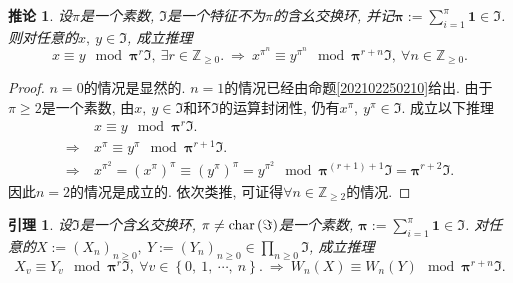 \documentclass[UTF8, twoside]{ctexart}
\theoremstyle{nonumberplain}
\newtheorem{proof}{\heiti 证明}  %
\theoremstyle{nonumberplain}
\theoremstyle{plain}
\newtheorem{yinli4}[dingyi4]{引理}
\newtheorem{tuilun4}[dingyi4]{推论}
\begin{document}
	\begin{tuilun4} \label{202102250947}
		设$\pi $是一个素数, $\Im $是一个特征不为$\pi $的含幺交换环, 并记$\bm{\pi} :=\sum_{i=1}^{\pi }{\bm{1}\in \Im }$. 则对任意的$x,\ y\in \Im $, 成立推理
		\[
			x\equiv y\ \bmod {\bm{\pi }^{r}}\Im ,
			\ \exists r\in {{\mathbb{Z}}_{\ge 0}}.
			\ \Longrightarrow \ 
			{{x}^{{{\pi }^{n}}}}\equiv {{y}^{{{\pi }^{n}}}}\ \bmod {\bm{\pi }^{r+n}}\Im ,
			\ \forall n\in {{\mathbb{Z}}_{\ge 0}}.
		\]
	\end{tuilun4}
	\begin{proof}
		$n=0$的情况是显然的. $n=1$的情况已经由命题\ref{202102250210}给出. 由于$\pi \ge 2$是一个素数, 由$x,\ y\in \Im $和环$\Im $的运算封闭性, 仍有${{x}^{\pi }},
		\ {{y}^{\pi }}\in \Im .$ 成立以下推理
		\begin{align*}
			& x\equiv y\ \bmod {\bm{\pi }^{r}}\Im . \\ 
			\Longrightarrow\ & {{x}^{\pi }}\equiv {{y}^{\pi }}\ \bmod {\bm{\pi }^{r+1}}\Im . \\ 
			\Longrightarrow\ & {{x}^{{{\pi }^{2}}}}={{\left( {{x}^{\pi }} \right)}^{\pi }}\equiv {{\left( {{y}^{\pi }} \right)}^{\pi }}={{y}^{{{\pi }^{2}}}}\ \bmod {\bm{\pi }^{\left( r+1 \right)+1}}\Im ={\bm{\pi }^{r+2}}\Im .
		\end{align*}
		因此$n=2$的情况是成立的. 依次类推, 可证得$\forall n\in {{\mathbb{Z}}_{\ge 2}}$的情况. 
	\end{proof}
	\begin{yinli4} \label{Witt论文中的引理}
		设$\Im $是一个含幺交换环, $\pi \ne \textup{char}\left( \Im  \right)$是一个素数, $\bm{\pi} :=\sum_{i=1}^{\pi }{\bm{1}\in \Im }$. 对任意的$X:={{\left( {{X}_{n}} \right)}_{n\ge 0}},\ Y:={{\left( {{Y}_{n}} \right)}_{n\ge 0}}\in \prod_{n\ge 0}^{{}}{\Im }$, 成立推理
		\[
			{{X}_{v}}\equiv {{Y}_{v}}\ \bmod {\bm{\pi }^{r}}\Im ,\ \forall v\in \left\{ 0,\ 1,\ \cdots ,\ n \right\}.
			\ \Longrightarrow \ 
			{{W}_{n}}\left( X \right)\equiv {{W}_{n}}\left( Y \right)\ \bmod {\bm{\pi }^{r+n}}\Im .
		\]
	\end{yinli4}
\end{document}
